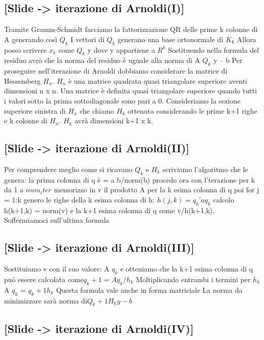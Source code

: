 \documentclass[a4paper]{article}
\begin{document}
\subsection*{[Slide -> iterazione di Arnoldi(I)]}
Tramite Gramm-Schmidt facciamo la fattorizzazione QR delle prime k colonne di A generando così $Q_k$
I vettori di $Q_k$ generano una base ortonormale di $K_k$
Allora posso scrivere $x_k$ come $Q_k$ y dove y appartiene a $R^k$
Sostituendo nella formula del residuo avrò che la norma del residuo è uguale alla norma di A $Q_k$ y – b
Per proseguire nell’iterazione di Arnoldi dobbiamo considerare la matrice di Hessemberg $H_n$.
$H_n$ è una matrice quadrata quasi triangolare superiore aventi dimensioni n x n. 
Una matrice è definita quasi triangolare superiore quando tutti i valori sotto la prima sottodiagonale sono pari a 0.
Consideriamo la sezione superiore sinistra di $H_n$ che chiamo $H_k$ ottenuta considerando le prime k+1 righe e k colonne di $H_n$. $H_k$ avrà dimensioni k+1 x k.


\subsection*{[Slide -> iterazione di Arnoldi(II)]}
Per comprendere meglio come si ricavano $Q_k$ e $H_k$ scriviamo l’algoritmo che le genera:
la prima colonna di q è = a b/norm(b)
procedo ora con l’terazione per k da 1 a $num_iter$
memorizzo in v il prodotto A per la k esima colonna di q
poi for j = 1:k genero le righe della k esima colonna di h: $h(j,k)=q_k’ a q_k$
calcolo h(k+1,k) = norm(v) e la k+1 esima colonna di q come v/h(k+1,k).
Soffermiamoci sull’ultima formula

\subsection*{[Slide -> iterazione di Arnoldi(III)]}

Sostituiamo v con il suo valore: A $q_k$ e otteniamo che la k+1 esima colonna di q può essere calcolata come$ q_k+1 = A q_k / h_k$
Moltiplicando entrambi i termini per $h_k$ A $q_k$ = $q_k+1 h_k $
Questa formula vale anche in forma matriciale
La norma da minimizzare sarà norma di$ Q_k+1 H_k y - b$


\subsection*{[Slide -> iterazione di Arnoldi(IV)]}
\end{document}
